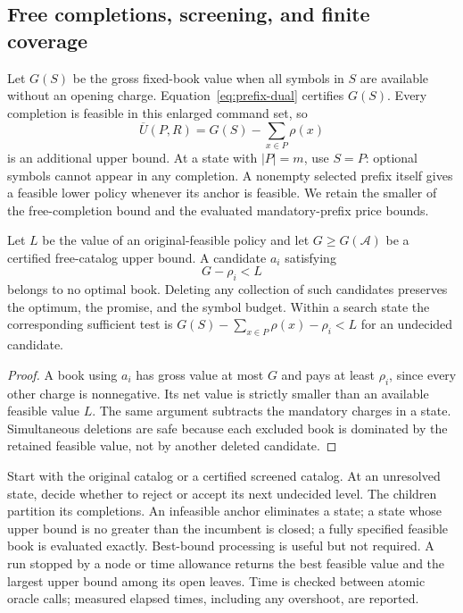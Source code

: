 \subsection{Free completions, screening, and finite coverage}
Let $G(S)$ be the gross fixed-book value when all symbols in $S$ are available without an opening charge. Equation~\eqref{eq:prefix-dual} certifies $G(S)$. Every completion is feasible in this enlarged command set, so
\begin{equation}\label{eq:r51-free-upper}
 \overline U(P,R)=G(S)-\sum_{x\in P}\rho(x)
\end{equation}
is an additional upper bound. At a state with $|P|=m$, use $S=P$: optional symbols cannot appear in any completion. A nonempty selected prefix itself gives a feasible lower policy whenever its anchor is feasible. We retain the smaller of the free-completion bound and the evaluated mandatory-prefix price bounds.

\begin{proposition}\label{prop:r51-screen}
Let $L$ be the value of an original-feasible policy and let $G\geq G(\mathcal A)$ be a certified free-catalog upper bound. A candidate $a_i$ satisfying
\begin{equation}\label{eq:r51-screen}
 G-\rho_i<L
\end{equation}
belongs to no optimal book. Deleting any collection of such candidates preserves the optimum, the promise, and the symbol budget. Within a search state the corresponding sufficient test is $G(S)-\sum_{x\in P}\rho(x)-\rho_i<L$ for an undecided candidate.
\end{proposition}
\begin{proof}
A book using $a_i$ has gross value at most $G$ and pays at least $\rho_i$, since every other charge is nonnegative. Its net value is strictly smaller than an available feasible value $L$. The same argument subtracts the mandatory charges in a state. Simultaneous deletions are safe because each excluded book is dominated by the retained feasible value, not by another deleted candidate.
\end{proof}

Start with the original catalog or a certified screened catalog. At an unresolved state, decide whether to reject or accept its next undecided level. The children partition its completions. An infeasible anchor eliminates a state; a state whose upper bound is no greater than the incumbent is closed; a fully specified feasible book is evaluated exactly. Best-bound processing is useful but not required. A run stopped by a node or time allowance returns the best feasible value and the largest upper bound among its open leaves. Time is checked between atomic oracle calls; measured elapsed times, including any overshoot, are reported.

